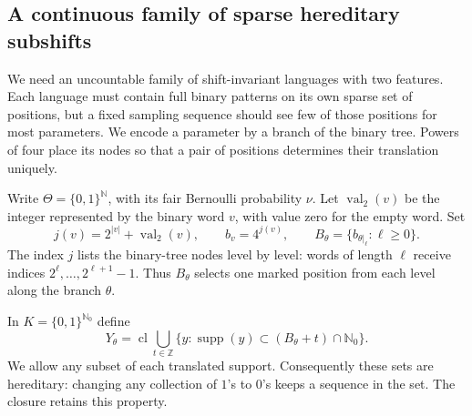 \documentclass[11pt,reqno]{amsart}
\numberwithin{equation}{section}
\theoremstyle{definition}
\theoremstyle{definition}
\newcommand{\N}{\mathbb N}
\newcommand{\Nzero}{\mathbb N_0}
\newcommand{\supp}{\operatorname{supp}}
\begin{document}
\subsection{A continuous family of sparse hereditary subshifts}

We need an uncountable family of shift-invariant languages with two
features. Each language must contain full binary patterns on its own
sparse set of positions, but a fixed sampling sequence should see few
of those positions for most parameters. We encode a parameter by a
branch of the binary tree. Powers of four place its nodes so that a
pair of positions determines their translation uniquely.

Write $\Theta=\{0,1\}^{\N}$, with its fair Bernoulli probability
$\nu$. Let $\operatorname{val}_2(v)$ be the integer represented by
the binary word $v$, with value zero for the empty word. Set
\[
 j(v)=2^{|v|}+\operatorname{val}_2(v),\qquad
 b_v=4^{j(v)},\qquad
 B_\theta=\{b_{\theta|_\ell}:\ell\ge0\}.
\]
The index $j$ lists the binary-tree nodes level by level: words of
length $\ell$ receive indices $2^\ell,\ldots,2^{\ell+1}-1$.
Thus $B_\theta$ selects one marked position from each level along
the branch $\theta$.

In $K=\{0,1\}^{\Nzero}$ define
\[
 Y_\theta=
 \operatorname{cl}\bigcup_{t\in\mathbb Z}
 \{y:\supp(y)\subset(B_\theta+t)\cap\Nzero\}.
\]
We allow any subset of each translated support. Consequently these
sets are hereditary: changing any collection of $1$'s to $0$'s
keeps a sequence in the set. The closure retains this property.
\end{document}
